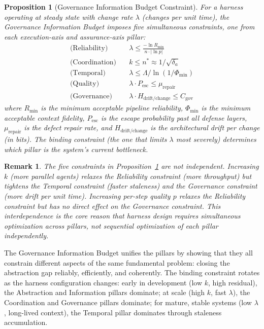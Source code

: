 \documentclass[11pt, a4paper, logo, copyright]{googledeepmind}
\newtheorem{proposition}{Proposition}[section]
\newtheorem*{remark}{Remark}
\begin{document}
\begin{proposition}[Governance Information Budget Constraint]
\label{prop:gib-constraint}
For a harness operating at steady state with change rate $\lambda$ (changes per unit time), the Governance Information Budget imposes five simultaneous constraints, one from each execution-axis and assurance-axis pillar:
\begin{align}
    \text{(Reliability)} &\quad \lambda \leq \frac{-\ln R_{\min}}{n \cdot |\ln p|} \label{eq:gib-rel} \\
    \text{(Coordination)} &\quad k \leq n^* \approx 1/\sqrt{\delta_a} \label{eq:gib-coord} \\
    \text{(Temporal)} &\quad \lambda \leq \Lambda / \ln(1/\Phi_{\min}) \label{eq:gib-temp} \\
    \text{(Quality)} &\quad \lambda \cdot P_{\text{esc}} \leq \mu_{\text{repair}} \label{eq:gib-qual} \\
    \text{(Governance)} &\quad \lambda \cdot H_{\text{drift/change}} \leq C_{\text{gov}} \label{eq:gib-gov}
\end{align}
where $R_{\min}$ is the minimum acceptable pipeline reliability, $\Phi_{\min}$ is the minimum acceptable context fidelity, $P_{\text{esc}}$ is the escape probability past all defense layers, $\mu_{\text{repair}}$ is the defect repair rate, and $H_{\text{drift/change}}$ is the architectural drift per change (in bits). The binding constraint (the one that limits $\lambda$ most severely) determines which pillar is the system's current bottleneck.
\end{proposition}

\begin{remark}
The five constraints in Proposition~\ref{prop:gib-constraint} are not independent. Increasing $k$ (more parallel agents) relaxes the Reliability constraint (more throughput) but tightens the Temporal constraint (faster staleness) and the Governance constraint (more drift per unit time). Increasing per-step quality $p$ relaxes the Reliability constraint but has no direct effect on the Governance constraint. This interdependence is the core reason that harness design requires simultaneous optimization across pillars, not sequential optimization of each pillar independently.
\end{remark}

The Governance Information Budget unifies the pillars by showing that they all constrain different aspects of the same fundamental problem: closing the abstraction gap reliably, efficiently, and coherently. The binding constraint rotates as the harness configuration changes: early in development (low $k$, high residual), the Abstraction and Information pillars dominate; at scale (high $k$, fast $\lambda$), the Coordination and Governance pillars dominate; for mature, stable systems (low $\lambda$, long-lived context), the Temporal pillar dominates through staleness accumulation.
\end{document}
